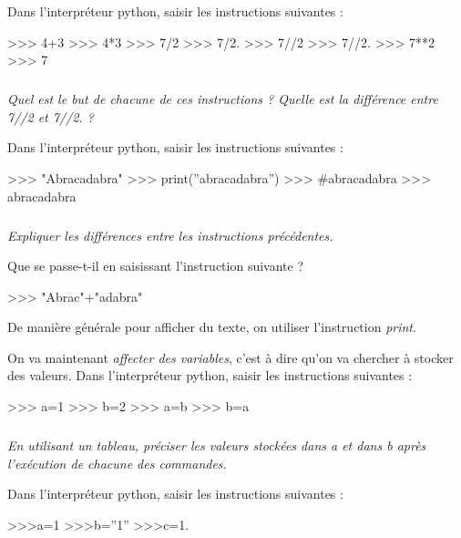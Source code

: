 \documentclass[10pt]{article}
\begin{document}
Dans l'interpréteur python, saisir les instructions suivantes :
\begin{py}
\begin{python}
>>> 4+3
>>> 4*3
>>> 7/2
>>> 7/2.
>>> 7//2
>>> 7//2.
>>> 7**2
>>> 7%
\end{python}
\end{py}

\subparagraph{}
\textit{Quel est le but de chacune de ces instructions ? Quelle est la différence entre \textsf{7//2} et \textsf{7//2.} ?}

Dans l'interpréteur python, saisir les instructions suivantes :
\begin{py}
\begin{python}
>>> "Abracadabra"
>>> print(''abracadabra'')
>>>  #abracadabra
>>>  abracadabra
\end{python}
\end{py}

\subparagraph{}
\textit{Expliquer les différences entre les instructions précédentes.}


\begin{rem}
Que se passe-t-il en saisissant l'instruction suivante ?
\begin{py}
\begin{python}
>>> "Abrac"+"adabra"
\end{python}
\end{py}
\end{rem}

\begin{rem}
De manière générale pour afficher du texte, on utiliser l'instruction \textsl{print}.
\end{rem}

On va maintenant \textit{affecter des variables}, c'est à dire qu'on va chercher à stocker des valeurs. Dans l'interpréteur python, saisir les instructions suivantes :

\begin{py}
\begin{python}
>>> a=1
>>> b=2
>>> a=b
>>> b=a
\end{python}
\end{py}

\subparagraph{} 
\textit{En utilisant un tableau, préciser les valeurs stockées dans a et dans b après l’exécution de chacune des commandes.}


Dans l'interpréteur python, saisir les instructions suivantes :
\begin{py}
\begin{python}
>>>a=1
>>>b=''1''
>>>c=1.
\end{python}
\end{py}
\end{document}
